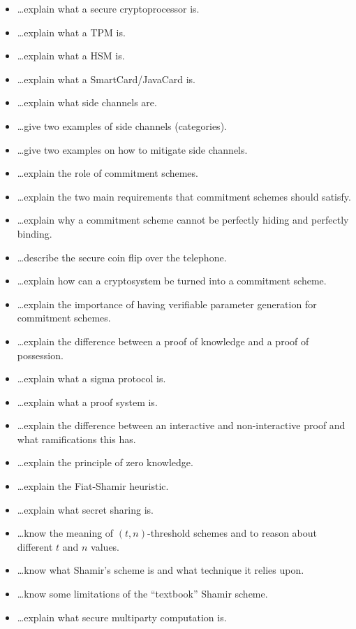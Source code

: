 \documentclass[usegeometry,parskip=half]{scrartcl}
\begin{document}
\begin{itemize}
  \item \dots{}explain what a secure cryptoprocessor is.
  \item \dots{}explain what a TPM is.
  \item \dots{}explain what a HSM is.
  \item \dots{}explain what a SmartCard/JavaCard is.
  \item \dots{}explain what side channels are.
  \item \dots{}give two examples of side channels (categories).
  \item \dots{}give two examples on how to mitigate side channels.
  \item \dots{}explain the role of commitment schemes.
  \item \dots{}explain the two main requirements that commitment schemes should satisfy.
  \item \dots{}explain why a commitment scheme cannot be perfectly hiding and perfectly binding.
  \item \dots{}describe the secure coin flip over the telephone.
  \item \dots{}explain how can a cryptosystem be turned into a commitment scheme.
  \item \dots{}explain the importance of having verifiable parameter generation for commitment schemes.
  \item \dots{}explain the difference between a proof of knowledge and a proof of possession.
  \item \dots{}explain what a sigma protocol is.
  \item \dots{}explain what a proof system is.
  \item \dots{}explain the difference between an interactive and non-interactive proof and what ramifications this has.
  \item \dots{}explain the principle of zero knowledge.
  \item \dots{}explain the Fiat-Shamir heuristic.
  \item \dots{}explain what secret sharing is.
  \item \dots{}know the meaning of $(t, n)$-threshold schemes and to reason about different $t$ and $n$ values.
  \item \dots{}know what Shamir's scheme is and what technique it relies upon.
  \item \dots{}know some limitations of the \enquote{textbook} Shamir scheme.
  \item \dots{}explain what secure multiparty computation is.

\end{itemize}
\end{document}
